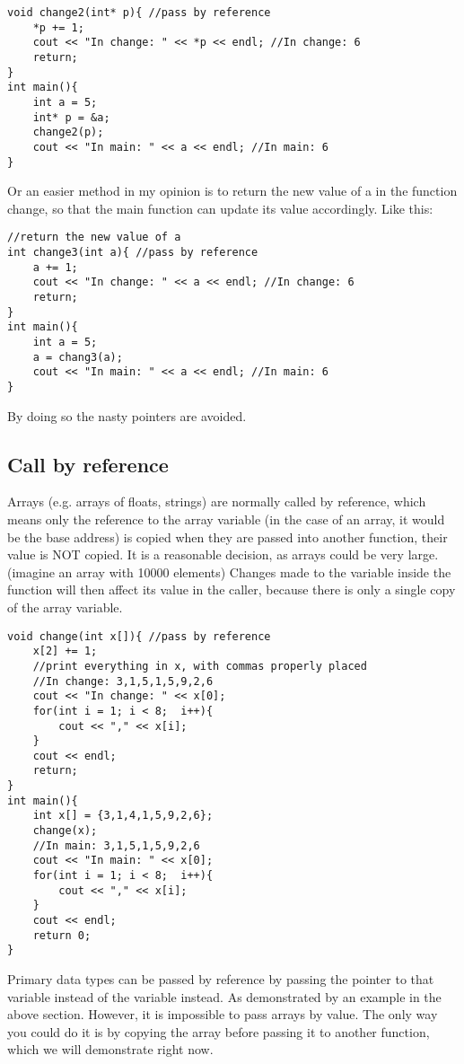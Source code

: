 \begin{lstlisting}
void change2(int* p){ //pass by reference
    *p += 1;
    cout << "In change: " << *p << endl; //In change: 6
    return;
}
int main(){
    int a = 5;
    int* p = &a;
    change2(p);
    cout << "In main: " << a << endl; //In main: 6
}
\end{lstlisting}

Or an easier method in my opinion is to return the new value of a in the function change, so that the main function can update its value accordingly. Like this:

\begin{lstlisting}
//return the new value of a
int change3(int a){ //pass by reference
    a += 1;
    cout << "In change: " << a << endl; //In change: 6
    return;
}
int main(){
    int a = 5;
    a = chang3(a);
    cout << "In main: " << a << endl; //In main: 6
}
\end{lstlisting}

By doing so the nasty pointers are avoided.

\subsection{Call by reference}

Arrays (e.g. arrays of floats, strings) are normally called by reference, which means only the reference to the array variable (in the case of an array, it would be the base address) is copied when they are passed into another function, their value is NOT copied. It is a reasonable decision, as arrays could be very large. (imagine an array with 10000 elements) Changes made to the variable inside the function will then affect its value in the caller, because there is only a single copy of the array variable.

\begin{lstlisting}
void change(int x[]){ //pass by reference
    x[2] += 1;
    //print everything in x, with commas properly placed
    //In change: 3,1,5,1,5,9,2,6
    cout << "In change: " << x[0];
    for(int i = 1; i < 8;  i++){
        cout << "," << x[i];
    }
    cout << endl;
    return;
}
int main(){
    int x[] = {3,1,4,1,5,9,2,6};
    change(x);
    //In main: 3,1,5,1,5,9,2,6
    cout << "In main: " << x[0];
    for(int i = 1; i < 8;  i++){
        cout << "," << x[i];
    }
    cout << endl;
    return 0;
}
\end{lstlisting}

Primary data types can be passed by reference by passing the pointer to that variable instead of the variable instead. As demonstrated by an example in the above section. However, it is impossible to pass arrays by value. The only way you could do it is by copying the array before passing it to another function, which we will demonstrate right now.

